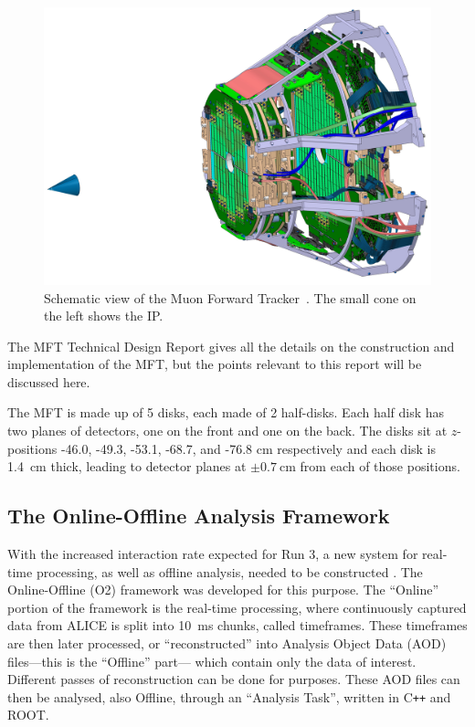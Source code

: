 \documentclass[11pt]{article}
\numberwithin{equation}{section}
\numberwithin{figure}{section}
\numberwithin{table}{section}
\begin{document}
\begin{figure}[h]
    \begin{center}
        \includegraphics[width=.8\textwidth]{Figs/MFT_schematic.jpg}
        \caption{Schematic view of the Muon Forward Tracker~\cite{MFT_Schematic}. The small cone on the left shows the IP.}
        \label{fig:MFT Schematic}
    \end{center}
\end{figure}

The MFT Technical Design Report \cite{MFT_TDR} gives all the details on the construction and implementation of the MFT, but the points relevant to this report will be discussed here.

The MFT is made up of 5 disks, each made of 2 half-disks. Each half disk has two planes of detectors, one on the front and one on the back. The disks sit at $z$-positions -46.0, -49.3, -53.1, -68.7, and -76.8 \si{\centi\metre} respectively and each disk is \SI{1.4}{\centi\metre} thick, leading to detector planes at $\pm \SI{0.7}{\centi\metre}$ from each of those positions. 


\subsection{The Online-Offline Analysis Framework}
With the increased interaction rate expected for Run 3, a new system for real-time processing, as well as offline analysis, needed to be constructed \cite{ALICE_Upgrade_LOI}. The Online-Offline (O2) framework was developed for this purpose. The ``Online'' portion of the framework is the real-time processing, where continuously captured data from ALICE is split into \SI{10}{\milli\second} chunks, called timeframes. These timeframes are then later processed, or ``reconstructed'' into Analysis Object Data (AOD) files---this is the ``Offline'' part--- which contain only the data of interest. Different passes of reconstruction can be done for purposes. These AOD files can then be analysed, also Offline, through an ``Analysis Task'', written in C\texttt{++} and ROOT. 
\end{document}
